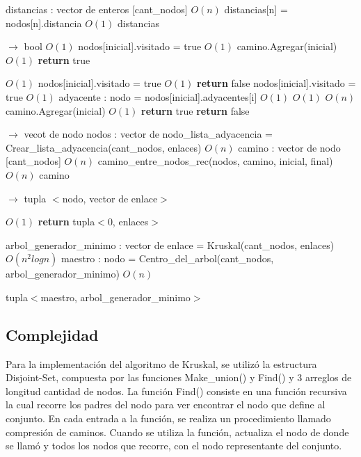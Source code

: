 \documentclass[a4paper, 10pt, twoside]{article}
\newenvironment{pseudo}[1][]{%
    \vspace{0.5em}%
    \begin{algorithmic}%
}
{%
    \end{algorithmic}%
    \vspace{0.5em}%
}
\newcommand{\Ode}[1]{\hfill $O(#1)$}
\begin{document}
\begin{pseudo}
	\State distancias : vector de enteros [cant\_nodos]							\Ode{n}
		\State distancias[n] = nodos[n].distancia								\Ode{1}
	\EndFor
	\Return distancias
\EndProcedure

 $\rightarrow$ bool
    															\Ode{1}
        \State nodos[inicial].visitado = true										\Ode{1}
        \State camino.Agregar(inicial)												\Ode{1}
        \State \textbf{return} true
    \EndIf

    										\Ode{1}
        \State nodos[inicial].visitado = true										\Ode{1}
        \State \textbf{return} false
    \Else
        \State nodos[inicial].visitado = true										\Ode{1}
        	\State adyacente : nodo = nodos[inicial].adyacentes[i]					\Ode{1}
            											\Ode{1}
                		\Ode{n}
                    \State camino.Agregar(inicial)									\Ode{1}
                    \textbf{return} true
                \EndIf
            \EndIf
        \EndFor
        \State \textbf{return} false
    \EndIf
\EndProcedure

 $\rightarrow$ vecot de nodo
    \State nodos : vector de nodo\_lista\_adyacencia = Crear\_lista\_adyacencia(cant\_nodos, enlaces) \Ode{n}
    \State camino : vector de nodo [cant\_nodos]											\Ode{n}
    \State camino\_entre\_nodos\_rec(nodos, camino, inicial, final)							\Ode{n}
    \Return camino
\EndProcedure


 $\rightarrow$ tupla $<$nodo, vector de enlace$>$

																	\Ode{1}
		\State \textbf{return} tupla$<$0, enlaces$>$
	\EndIf

	\State arbol\_generador\_minimo : vector de enlace = Kruskal(cant\_nodos, enlaces) \Ode{n^2 log n}
	\State maestro : nodo = Centro\_del\_arbol(cant\_nodos, arbol\_generador\_minimo)	\Ode{n}

    \Return tupla$<$maestro, arbol\_generador\_minimo$>$
\EndProcedure
\end{pseudo}
\subsection{Complejidad}
Para la implementación del algoritmo de Kruskal, se utilizó la estructura Disjoint-Set, compuesta por las funciones Make\_union() y Find() y 3 arreglos de longitud cantidad de nodos.
La función Find() consiste en una función recursiva la cual recorre los padres del nodo para ver encontrar el nodo que define al conjunto. En cada entrada a la función, se realiza un procedimiento llamado compresión de caminos. Cuando se utiliza la función, actualiza el nodo de donde se llamó y todos los nodos que recorre, con el nodo representante del conjunto.
\end{document}
